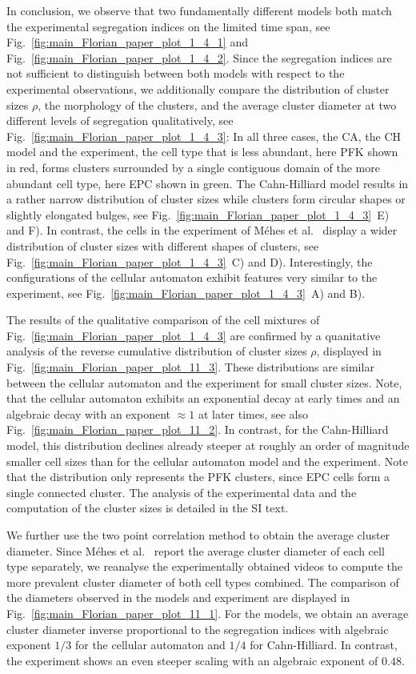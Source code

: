 \documentclass[10pt,letterpaper]{article}
\newcommand{\figref}[1]{Fig.~\ref{fig:#1}}
\begin{document}
In conclusion, we observe that two fundamentally different models both
match the experimental segregation indices on the limited time span,
see \figref{main_Florian_paper_plot_1_4_1} and
\figref{main_Florian_paper_plot_1_4_2}. Since the segregation indices
are not sufficient to distinguish between both models with respect to
the experimental observations, we additionally compare the
distribution of cluster sizes $\rho$, the morphology of the clusters, and the
average cluster diameter at two different levels of segregation
qualitatively, see \figref{main_Florian_paper_plot_1_4_3}: In all
three cases, the CA, the CH model and the experiment, the cell type that is less abundant, here PFK shown in
red, forms clusters surrounded by a single contiguous domain of the
more abundant cell type, here EPC shown in green. The Cahn-Hilliard
model results in a rather narrow distribution of cluster sizes while
clusters form circular shapes or slightly elongated bulges, see
\figref{main_Florian_paper_plot_1_4_3}~E) and F). In contrast, the
cells in the experiment of Méhes et al.~\cite{MehMonNemVic2012}
display a wider distribution of cluster sizes with different shapes of
clusters, see \figref{main_Florian_paper_plot_1_4_3}~C) and D).
Interestingly, the configurations of the cellular automaton exhibit
features very similar to the experiment, see
\figref{main_Florian_paper_plot_1_4_3}~A) and B).

The results of the qualitative comparison of the cell mixtures of
\figref{main_Florian_paper_plot_1_4_3} are confirmed by a quanitative
analysis of the reverse cumulative distribution of cluster sizes $\rho$,
displayed in \figref{main_Florian_paper_plot_11_3}. These
distributions are similar between the cellular automaton and the experiment
for small cluster sizes. Note, that the cellular automaton exhibits an
exponential decay at early times and an algebraic decay with an exponent
$\approx 1$ at later times,
see also \figref{main_Florian_paper_plot_11_2}. In contrast, for the
Cahn-Hilliard model, this distribution declines already steeper at
roughly an order of magnitude smaller cell sizes than for the cellular
automaton model and the experiment. Note that the distribution only
represents the PFK clusters, since EPC cells form a single connected
cluster. The analysis of the experimental data and the computation of the
cluster sizes is detailed in the SI text.

We further use the two point correlation method to obtain the average
cluster diameter. Since Méhes et al.~\cite{MehMonNemVic2012} report
the average cluster diameter of each cell type separately, we
reanalyse the experimentally obtained videos to compute the more
prevalent cluster diameter of both cell types combined. The comparison
of the diameters observed in the models and experiment are displayed
in \figref{main_Florian_paper_plot_11_1}. For the models, we obtain
an average cluster diameter inverse proportional to the
segregation indices with algebraic exponent $1/3$ for the cellular
automaton and $1/4$ for Cahn-Hilliard. In contrast, the experiment
shows an even steeper scaling with an algebraic exponent of $0.48$.
\end{document}
